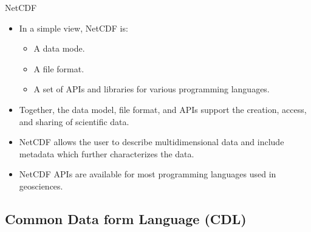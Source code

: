 \documentclass[compress,11pt,xcolor=svgnames,aspectratio=169]{beamer}
\begin{document}
\begin{frame}[t]{NetCDF}

\begin{itemize}
\setlength\itemsep{0.4cm}

\item In a simple view, NetCDF is:

    \begin{itemize}
        \item A data mode.
        \item A file format.
        \item A set of APIs and libraries for various programming languages.
    \end{itemize}

\item Together, the data model, file format, and APIs support the creation, access, and sharing of scientific data.

\item NetCDF allows the user to describe multidimensional data and include metadata which further characterizes the data.

\item NetCDF APIs are available for most programming languages used in geosciences.

\end{itemize}

\nocite{netcdf}

\end{frame}

\subsection{Common Data form Language (CDL)}
\end{document}
